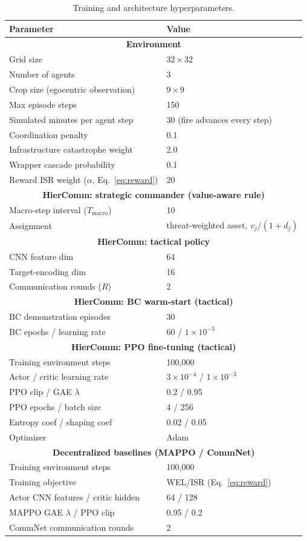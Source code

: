 \documentclass[letterpaper]{article}
\begin{document}
\begin{table}[h]
\centering
\caption{Training and architecture hyperparameters.}
\label{tab:hyperparams}
\begin{tabular}{ll}
\toprule
Parameter & Value \\
\midrule
\multicolumn{2}{c}{\textbf{Environment}} \\
Grid size & $32 \times 32$ \\
Number of agents & 3 \\
Crop size (egocentric observation) & $9 \times 9$ \\
Max episode steps & 150 \\
Simulated minutes per agent step & 30 (fire advances every step) \\
Coordination penalty & 0.1 \\
Infrastructure catastrophe weight & 2.0 \\
Wrapper cascade probability & 0.1 \\
Reward ISR weight ($\alpha$, Eq.~\ref{eq:reward}) & 20 \\
\midrule
\multicolumn{2}{c}{\textbf{HierComm: strategic commander (value-aware rule)}} \\
Macro-step interval ($T_{\text{macro}}$) & 10 \\
Assignment & threat-weighted asset, $v_j/(1{+}d_j)$ \\
\midrule
\multicolumn{2}{c}{\textbf{HierComm: tactical policy}} \\
CNN feature dim & 64 \\
Target-encoding dim & 16 \\
Communication rounds ($R$) & 2 \\
\midrule
\multicolumn{2}{c}{\textbf{HierComm: BC warm-start (tactical)}} \\
BC demonstration episodes & 30 \\
BC epochs / learning rate & 60 / $1 \times 10^{-3}$ \\
\midrule
\multicolumn{2}{c}{\textbf{HierComm: PPO fine-tuning (tactical)}} \\
Training environment steps & 100,000 \\
Actor / critic learning rate & $3\times10^{-4}$ / $1\times10^{-3}$ \\
PPO clip / GAE $\lambda$ & 0.2 / 0.95 \\
PPO epochs / batch size & 4 / 256 \\
Entropy coef / shaping coef & 0.02 / 0.05 \\
Optimizer & Adam \\
\midrule
\multicolumn{2}{c}{\textbf{Decentralized baselines (MAPPO / CommNet)}} \\
Training environment steps & 100,000 \\
Training objective & WEL/ISR (Eq.~\ref{eq:reward}) \\
Actor CNN features / critic hidden & 64 / 128 \\
MAPPO GAE $\lambda$ / PPO clip & 0.95 / 0.2 \\
CommNet communication rounds & 2 \\
\bottomrule
\end{tabular}
\end{table}
\end{document}
